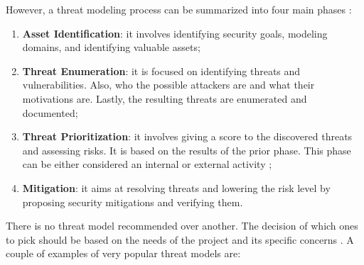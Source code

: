 However, a threat modeling process can be summarized into four main phases \cite{messe2020asset}:
\begin{enumerate}
    \item \textbf{Asset Identification}: it involves identifying security goals, modeling domains, and identifying valuable assets;
    \item \textbf{Threat Enumeration}: it is focused on identifying threats and vulnerabilities. Also, who the possible attackers are and what their motivations are. Lastly, the resulting threats are enumerated and documented;
    \item \textbf{Threat Prioritization}: it involves giving a score to the discovered threats and assessing risks. It is based on the results of the prior phase. This phase can be either considered an internal or external activity \cite{tuma2018};
    \item \textbf{Mitigation}: it aims at resolving threats and lowering the risk level by proposing security mitigations and verifying them.
\end{enumerate}
There is no threat model recommended over another. The decision of which ones to pick should be based on the needs of the project and its specific concerns \cite{shevchenko2018threat}.
A couple of examples of very popular threat models are:
